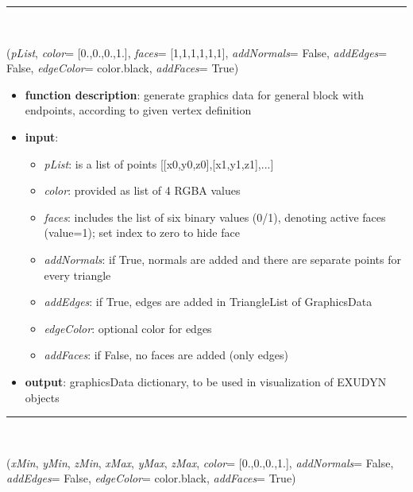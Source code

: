 \begin{itemize}[leftmargin=1.4cm]
\begin{itemize}[leftmargin=1.4cm]
\begin{itemize}[leftmargin=1.4cm]
\begin{itemize}[leftmargin=0.5cm]
\begin{itemize}[leftmargin=1.4cm]
\begin{itemize}[leftmargin=1.4cm]
\begin{itemize}[leftmargin=1.4cm]
\begin{itemize}[leftmargin=0.5cm]
\begin{itemize}[leftmargin=1.4cm]
%
\noindent\rule{8cm}{0.75pt}\vspace{1pt} \\ 
\begin{flushleft}
\label{sec:graphics:Cuboid}
({\it pList}, {\it color}= [0.,0.,0.,1.], {\it faces}= [1,1,1,1,1,1], {\it addNormals}= False, {\it addEdges}= False, {\it edgeColor}= color.black, {\it addFaces}= True)
\end{flushleft}
\setlength{\itemindent}{0.7cm}
\begin{itemize}[leftmargin=0.7cm]
\item[--]
{\bf function description}: generate graphics data for general block with endpoints, according to given vertex definition
\item[--]
{\bf input}: \vspace{-6pt}
\begin{itemize}[leftmargin=1.2cm]
\setlength{\itemindent}{-0.7cm}
\item[]{\it pList}: is a list of points [[x0,y0,z0],[x1,y1,z1],...]
\item[]{\it color}: provided as list of 4 RGBA values
\item[]{\it faces}: includes the list of six binary values (0/1), denoting active faces (value=1); set index to zero to hide face
\item[]{\it addNormals}: if True, normals are added and there are separate points for every triangle
\item[]{\it addEdges}: if True, edges are added in TriangleList of GraphicsData
\item[]{\it edgeColor}: optional color for edges
\item[]{\it addFaces}: if False, no faces are added (only edges)
\end{itemize}
\item[--]
{\bf output}: graphicsData dictionary, to be used in visualization of EXUDYN objects
\vspace{12pt}\end{itemize}
%
\noindent\rule{8cm}{0.75pt}\vspace{1pt} \\ 
\begin{flushleft}
\label{sec:graphics:BrickXYZ}
({\it xMin}, {\it yMin}, {\it zMin}, {\it xMax}, {\it yMax}, {\it zMax}, {\it color}= [0.,0.,0.,1.], {\it addNormals}= False, {\it addEdges}= False, {\it edgeColor}= color.black, {\it addFaces}= True)

\end{flushleft}
\end{itemize}
\end{itemize}
\end{itemize}
\end{itemize}
\end{itemize}
\end{itemize}
\end{itemize}
\end{itemize}
\end{itemize}
